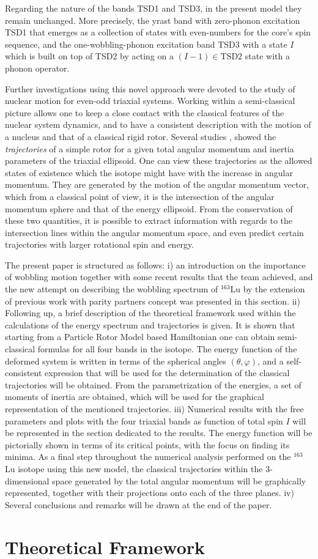 \documentclass[%
 reprint,
 amsmath,
 amssymb,
 aps,
]{revtex4-2}
\begin{document}
Regarding the nature of the bands TSD1 and TSD3, in the present model they remain unchanged. More precisely, the yrast band with zero-phonon excitation TSD1 that emerges as a collection of states with even-numbers for the core's spin sequence, and the one-wobbling-phonon excitation band TSD3 with a state $I$ which is built on top of TSD2 by acting on a $(I-1)\in \text{TSD2}$ state with a phonon operator.

Further investigations using this novel approach were devoted to the study of nuclear motion for even-odd triaxial systems. Working within a semi-classical picture allows one to keep a close contact with the classical features of the nuclear system dynamics, and to have a consistent description with the motion of a nucleus and that of a classical rigid rotor. Several studies \cite{frauendorf2014transverse}, \cite{lawrie2020tilted} showed the \emph{trajectories} of a simple rotor for a given total angular momentum and inertia parameters of the triaxial ellipsoid. One can view these trajectories as the allowed states of existence which the isotope might have with the increase in angular momentum. They are generated by the motion of the angular momentum vector, which from a classical point of view, it is the intersection of the angular momentum sphere and that of the energy ellipsoid. From the conservation of these two quantities, it is possible to extract information with regards to the intersection lines within the angular momentum space, and even predict certain trajectories with larger rotational spin and energy.
 
The present paper is structured as follows: i) an introduction on the importance of wobbling motion together with some recent results that the team achieved, and the new attempt on describing the wobbling spectrum of $^{163}$Lu by the extension of previous work with parity partners concept was presented in this section. ii) Following up, a brief description of the theoretical framework used within the calculations of the energy spectrum and trajectories is given. It is shown that starting from a Particle Rotor Model based Hamiltonian one can obtain semi-classical formulas for all four bands in the isotope. The energy function of the deformed system is written in terms of the spherical angles $(\theta,\varphi)$, and a self-consistent expression that will be used for the determination of the classical trajectories will be obtained. From the parametrization of the energies, a set of moments of inertia are obtained, which will be used for the graphical representation of the mentioned trajectories. iii) Numerical results with the free parameters and plots with the four triaxial bands as function of total spin $I$ will be represented in the section dedicated to the results. The energy function will be pictorially shown in terms of its critical points, with the focus on finding its minima. As a final step throughout the numerical analysis performed on the $^{163}$Lu isotope using this new model, the classical trajectories within the 3-dimensional space generated by the total angular momentum will be graphically represented, together with their projections onto each of the three planes. iv) Several conclusions and remarks will be drawn at the end of the paper.

\section{Theoretical Framework}

\end{document}
